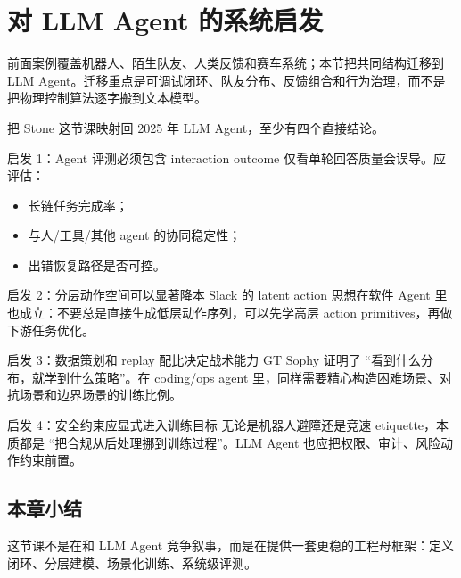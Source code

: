 \section{对 LLM Agent 的系统启发}

前面案例覆盖机器人、陌生队友、人类反馈和赛车系统；本节把共同结构迁移到 LLM Agent。迁移重点是可调试闭环、队友分布、反馈组合和行为治理，而不是把物理控制算法逐字搬到文本模型。

把 Stone 这节课映射回 2025 年 LLM Agent，至少有四个直接结论。

\begin{importantbox}{启发 1：Agent 评测必须包含 interaction outcome}
仅看单轮回答质量会误导。应评估：
\begin{itemize}
    \item 长链任务完成率；
    \item 与人/工具/其他 agent 的协同稳定性；
    \item 出错恢复路径是否可控。
\end{itemize}
\end{importantbox}

\begin{importantbox}{启发 2：分层动作空间可以显著降本}
Slack 的 latent action 思想在软件 Agent 里也成立：不要总是直接生成低层动作序列，可以先学高层 action primitives，再做下游任务优化。
\end{importantbox}

\begin{importantbox}{启发 3：数据策划和 replay 配比决定战术能力}
GT Sophy 证明了 ``看到什么分布，就学到什么策略''。在 coding/ops agent 里，同样需要精心构造困难场景、对抗场景和边界场景的训练比例。
\end{importantbox}

\begin{warningbox}{启发 4：安全约束应显式进入训练目标}
无论是机器人避障还是竞速 etiquette，本质都是 ``把合规从后处理挪到训练过程''。LLM Agent 也应把权限、审计、风险动作约束前置。
\end{warningbox}

\subsection{本章小结}
这节课不是在和 LLM Agent 竞争叙事，而是在提供一套更稳的工程母框架：定义闭环、分层建模、场景化训练、系统级评测。

